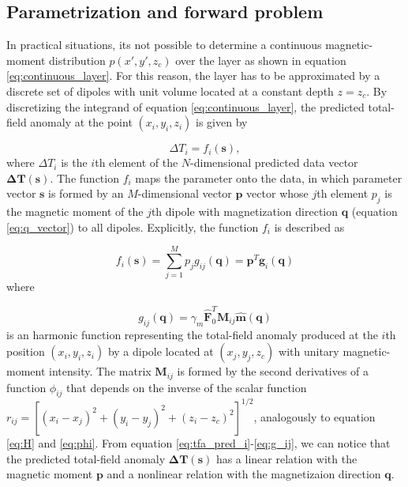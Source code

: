 \subsection{Parametrization and forward problem}

In practical situations, its not possible to determine a continuous magnetic-moment distribution $p(x',y',z_c)$ over the layer as shown in equation \ref{eq:continuous_layer}. For this reason, the layer has to be approximated by a discrete set of dipoles with unit volume located at a constant depth $z = z_c$. By discretizing the integrand of equation \ref{eq:continuous_layer}, the predicted total-field anomaly at the point $(x_i,y_i,z_i)$ is given by 

\begin{equation}
\Delta T_i = f_i(\mathbf{s}) ,
\label{eq:tfa_pred_i}
\end{equation}    
where $\Delta T_i$ is the $i$th element of the $N$-dimensional predicted data vector $\mathbf{\Delta T}(\mathbf{s})$. The function $f_i$ maps the parameter onto the data, in which parameter vector $\mathbf{s}$ is formed by an $M$-dimensional vector $\mathbf{p}$ vector whose $j$th element $p_j$ is the magnetic moment of the $j$th dipole with magnetization direction $\mathbf{q}$ (equation \ref{eq:q_vector}) to all dipoles. Explicitly, the function $f_i$ is described as 

\begin{equation}
f_i (\mathbf{s}) = \sum_{j=1}^{M} p_j g_{ij} (\mathbf{q}) = \mathbf{p}^T \mathbf{g}_i(\mathbf{q})
\label{eq:f_i}
\end{equation}
where

\begin{equation}
g_{ij} (\mathbf{q})  = \gamma_m \hat{\mathbf{F}}_0^T \mathbf{M}_{ij} \hat{\mathbf{m}}(\mathbf{q})
\label{eq:g_ij}
\end{equation}
is an harmonic function representing the total-field anomaly produced at the $i$th position $(x_i,y_i,z_i)$ by a dipole located at $(x_j,y_j,z_c)$ with unitary magnetic-moment intensity. The matrix $\mathbf{M}_{ij}$ is formed by the second derivatives of a function $\phi_{ij}$ that depends on the inverse of the scalar function $r_{ij} = [(x_i-x_j)^2 + (y_i-y_j)^2 + (z_i-z_c)^2]^{1/2}$, analogously to equation \ref{eq:H} and \ref{eq:phi}. From equation \ref{eq:tfa_pred_i}-\ref{eq:g_ij}, we can notice that the predicted total-field anomaly $\mathbf{\Delta T} (\mathbf{s})$ has a linear relation with the magnetic moment $\mathbf{p}$ and a nonlinear relation with the magnetizaion direction $\mathbf{q}$.    

